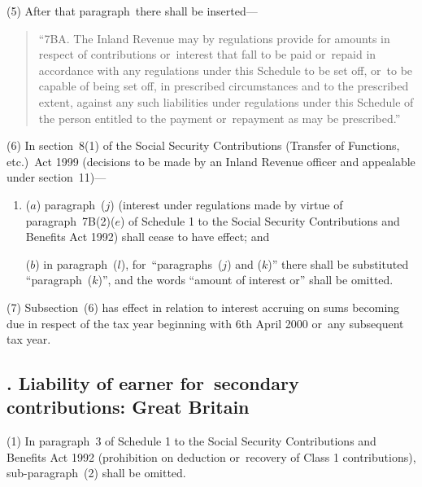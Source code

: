 \documentclass[12pt,a4paper]{article}
\begin{document}
(5) After that paragraph~there shall be inserted—
\begin{quotation}
“7BA. The Inland Revenue may by regulations provide for amounts in respect of contributions or~interest that fall to be paid or~repaid in accordance with any regulations under this Schedule to be set off, or~to be capable of being set off, in prescribed circumstances and to the prescribed extent, against any such liabilities under regulations under this Schedule of the person entitled to the payment or~repayment as may be prescribed.”
\end{quotation}

(6) In section~8(1)  of the Social Security Contributions (Transfer of Functions, etc.)\ Act 1999 (decisions to be made by an Inland Revenue officer and appealable under section~11)—
\begin{enumerate}\item[]
($a$) paragraph~($j$)  (interest under regulations made by virtue of paragraph~7B(2)($e$)  of Schedule 1 to the Social Security Contributions and Benefits Act 1992) shall cease to have effect; and

($b$) in paragraph~($l$), for~“paragraphs~($j$)  and ($k$)” there shall be substituted “paragraph~($k$)”, and the words “amount of interest or” shall be omitted.
\end{enumerate}

(7) Subsection~(6)  has effect in relation to interest accruing on sums becoming due in respect of the tax year beginning with 6th April 2000 or~any subsequent tax year.

\subsection[77. Liability of earner for~secondary contributions: Great Britain]{. Liability of earner for~secondary contributions: Great Britain}

(1) In paragraph~3 of Schedule 1 to the Social Security Contributions and Benefits Act 1992 (prohibition on deduction or~recovery of Class 1 contributions), sub-paragraph~(2)  shall be omitted.
\end{document}
